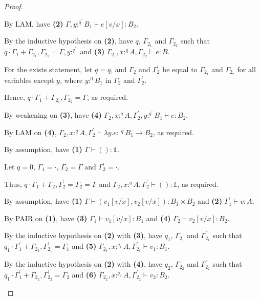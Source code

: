 \documentclass[acmsmall,screen,nonacm]{acmart}
\newcommand{\unit}{\mathbb{1}}
\newcommand{\tee}{\vdash}
\begin{document}
\begin{proof}
\begin{description}
    By LAM, have \textbf{(2)} $\Gamma, y :^{q^\prime} B_1 \tee e[v/x] : B_2$.

    By the inductive hypothesis on \textbf{(2)}, have $q$, $\Gamma_{2_1}$ and $\Gamma_{2_2}$ such that $q \cdot \Gamma_1 + \Gamma_{2_1}, \Gamma_{2_2} = \Gamma, y :^{q^\prime}$ and \textbf{(3)} $\Gamma_{2_1}, x :^q A, \Gamma_{2_2} \tee e : B$.

    For the exists statement, let $q = q$, and $\Gamma_2$ and $\Gamma_2^\prime$ be equal to $\Gamma_{2_1}$ and $\Gamma_{2_2}$ for all variables except $y$, where $y : ^0 B_1$ in $\Gamma_2$ and $\Gamma_2^\prime$.

    Hence, $q \cdot \Gamma_1 + \Gamma_{2_1}, \Gamma_{2_2} = \Gamma$, as required.

    By weakening on \textbf{(3)}, have \textbf{(4)} $\Gamma_2, x :^q A, \Gamma_2^\prime, y :^{q^\prime} B_1 \tee e : B_2$.

    By LAM on \textbf{(4)}, $\Gamma_2, x :^q A, \Gamma_2^\prime \tee \lambda y.e : \,^{q^\prime} B_1 \rightarrow B_2$, as required.
    \\
    \item[Case UNIT.] 
    By assumption, have \textbf{(1)} $\Gamma \tee () : \unit$.

    Let $q = 0$, $\Gamma_1 = \cdot$, $\Gamma_2 = \Gamma$ and $\Gamma_2^\prime = \cdot$.

    Thus, $q \cdot \Gamma_1 + \Gamma_2, \Gamma_2^\prime = \Gamma_2 = \Gamma$ and $\Gamma_2, x :^q A, \Gamma_2^\prime \tee () : \unit$, as required.
    \\
    \item[Case PAIR.] 
    By assumption, have \textbf{(1)} $\Gamma \tee (v_1[v/x], v_2[v/x]) : B_1 \times B_2$ and \textbf{(2)} $\Gamma_1^\prime \tee v : A$.
    
    By PAIR on \textbf{(1)}, have \textbf{(3)} $\Gamma_1 \tee v_1[v/x] : B_1$ and \textbf{(4)} $\Gamma_2 \tee v_2[v/x] : B_2$.

    By the inductive hypothesis on \textbf{(2)} with \textbf{(3)}, have $q_1$, $\Gamma_{2_1}$ and $\Gamma_{2_1}^\prime$ such that $q_1 \cdot \Gamma_1^\prime + \Gamma_{2_1}, \Gamma_{2_1}^\prime = \Gamma_1$ and \textbf{(5)} $\Gamma_{2_1}, x :^{q_1} A, \Gamma_{2_1}^\prime \tee v_1 : B_1$.
    
    By the inductive hypothesis on \textbf{(2)} with \textbf{(4)}, have $q_2$, $\Gamma_{2_2}$ and $\Gamma_{2_2}^\prime$ such that $q_1 \cdot \Gamma_1^\prime + \Gamma_{2_2}, \Gamma_{2_2}^\prime = \Gamma_2$ and \textbf{(6)} $\Gamma_{2_2}, x :^{q_2} A, \Gamma_{2_2}^\prime \tee v_2 : B_2$.


\end{description}
\end{proof}
\end{document}
